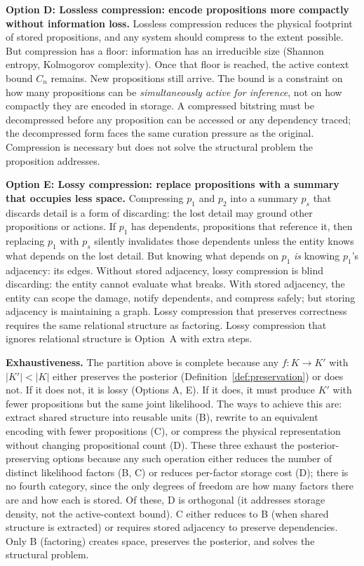 \documentclass[11pt]{article}
\theoremstyle{definition}
\begin{document}
\textbf{Option D: Lossless compression: encode propositions more
compactly without information loss.}
Lossless compression reduces the physical footprint of stored
propositions, and any system should compress to the extent possible.
But compression has a floor: information has an irreducible size
(Shannon entropy, Kolmogorov complexity). Once that floor is reached,
the active context bound $C_n$ remains. New propositions still arrive.
The bound is a constraint on how many propositions can be
\emph{simultaneously active for inference}, not on how compactly they
are encoded in storage. A compressed bitstring must be decompressed
before any proposition can be accessed or any dependency traced; the
decompressed form faces the same curation pressure as the original.
Compression is necessary but does not solve the structural problem
the proposition addresses.

\textbf{Option E: Lossy compression: replace propositions with a
summary that occupies less space.}
Compressing $p_1$ and $p_2$ into a summary $p_s$ that discards detail is
a form of discarding: the lost detail may ground other propositions or
actions. If $p_1$ has dependents, propositions that reference it,
then replacing $p_1$ with $p_s$ silently invalidates those dependents
unless the entity knows what depends on the lost detail. But knowing
what depends on $p_1$ \emph{is} knowing $p_1$'s adjacency: its
edges. Without stored adjacency, lossy compression is blind discarding:
the entity cannot evaluate what breaks. With stored adjacency, the
entity can scope the damage, notify dependents, and compress safely;
but storing adjacency is maintaining a graph. Lossy compression that
preserves correctness requires the same relational structure as
factoring. Lossy compression that ignores relational structure is
Option~A with extra steps.

\textbf{Exhaustiveness.} The partition above is complete because any
$f : K \to K'$ with $|K'| < |K|$ either preserves the posterior
(Definition~\ref{def:preservation}) or does not. If it does not, it is
lossy (Options A, E). If it does, it must produce $K'$ with fewer
propositions but the same joint likelihood. The ways to achieve this
are: extract shared structure into reusable units (B), rewrite to an
equivalent encoding with fewer propositions (C), or compress the
physical representation without changing propositional count (D). These
three exhaust the posterior-preserving options because any such
operation either reduces the number of distinct likelihood factors
(B, C) or reduces per-factor storage cost (D); there is no fourth
category, since the only degrees of freedom are how many factors
there are and how each is stored. Of these, D is orthogonal (it
addresses storage density, not the active-context bound). C either
reduces to B (when shared structure is extracted) or requires stored
adjacency to preserve dependencies. Only B (factoring) creates space,
preserves the posterior, and solves the structural problem.
\end{document}
